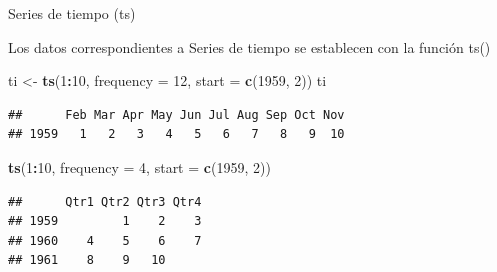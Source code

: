 \documentclass[ignorenonframetext,]{beamer}
\newenvironment{Shaded}{\begin{snugshade}}{\end{snugshade}}
\newcommand{\KeywordTok}[1]{\textcolor[rgb]{0.13,0.29,0.53}{\textbf{#1}}}
\newcommand{\DataTypeTok}[1]{\textcolor[rgb]{0.13,0.29,0.53}{#1}}
\newcommand{\DecValTok}[1]{\textcolor[rgb]{0.00,0.00,0.81}{#1}}
\newcommand{\StringTok}[1]{\textcolor[rgb]{0.31,0.60,0.02}{#1}}
\newcommand{\OperatorTok}[1]{\textcolor[rgb]{0.81,0.36,0.00}{\textbf{#1}}}
\newcommand{\NormalTok}[1]{#1}
\begin{document}
\begin{frame}[fragile]{Series de tiempo (ts)}

Los datos correspondientes a Series de tiempo se establecen con la
función ts()

\begin{Shaded}
\begin{Highlighting}[]
\NormalTok{ti <-}\StringTok{ }\KeywordTok{ts}\NormalTok{(}\DecValTok{1}\OperatorTok{:}\DecValTok{10}\NormalTok{, }\DataTypeTok{frequency =} \DecValTok{12}\NormalTok{, }\DataTypeTok{start =} \KeywordTok{c}\NormalTok{(}\DecValTok{1959}\NormalTok{, }\DecValTok{2}\NormalTok{))}
\NormalTok{ti}
\end{Highlighting}
\end{Shaded}

\begin{verbatim}
##      Feb Mar Apr May Jun Jul Aug Sep Oct Nov
## 1959   1   2   3   4   5   6   7   8   9  10
\end{verbatim}

\begin{Shaded}
\begin{Highlighting}[]
\KeywordTok{ts}\NormalTok{(}\DecValTok{1}\OperatorTok{:}\DecValTok{10}\NormalTok{, }\DataTypeTok{frequency =} \DecValTok{4}\NormalTok{, }\DataTypeTok{start =} \KeywordTok{c}\NormalTok{(}\DecValTok{1959}\NormalTok{, }\DecValTok{2}\NormalTok{))}
\end{Highlighting}
\end{Shaded}

\begin{verbatim}
##      Qtr1 Qtr2 Qtr3 Qtr4
## 1959         1    2    3
## 1960    4    5    6    7
## 1961    8    9   10
\end{verbatim}

\end{frame}
\end{document}
